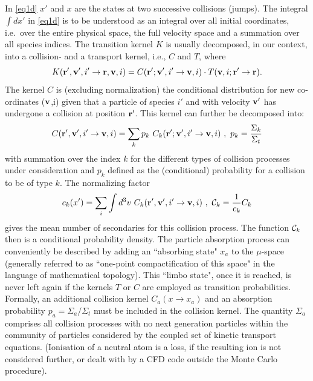 In \cref{eq1d} $x'$ and $x$ are the states at two successive collisions
(jumps).
The integral $\int dx'$ in \cref{eq1d} is to be understood as an integral over
all initial coordinates, i.e.\ over the entire physical space, the full
velocity space and a summation over all species indices.
The transition kernel $K$ is usually decomposed, in our context, into a
collision- and a transport kernel, i.e., $C$ and $T$, where
\begin{equation}
  \label{eq1.2} K(\mathbf{r}  ', \mathbf{v}  ', i ' \rightarrow \mathbf{r}, \mathbf{v}, i) = C( \mathbf{r} ' ; \mathbf{v}
  ', i '	      \rightarrow   \mathbf{v}, i)  \cdot T( \mathbf{v}, i; \mathbf{r} ' \rightarrow \mathbf{r} )
  .
\end{equation}
The kernel $C$ is (excluding normalization) the conditional distribution for
new co-ordinates ($\mathbf{v} $,i) given that a particle of species $i'$ and with
velocity $\mathbf{v}'$ has undergone a collision at position $\mathbf{r} ' $.
This kernel can further be decomposed into:
\begin{equation}
  \label{eq1.3}
  C( \mathbf{r} ', \mathbf{v} ', i '	 \rightarrow \mathbf{v}, i) = \sum_{k} {p_k  \ C_k ( \mathbf{r} ' ; \mathbf{v} ', i '   \rightarrow \mathbf{v}, i)} \ , \ p_k = \frac{\Sigma_k}{\Sigma_t}
\end{equation}
with summation over the index $k$ for the different types of
collision processes under consideration and $p_k$ defined as the (conditional)
probability for a collision to be of type $k$.
The normalizing factor
\begin{equation}
  \label{eq1.4} c_k (x ') = \sum_{i}
  \int d^3v \  C_k ( \mathbf{r} ', \mathbf{v} ', i ' \rightarrow \mathbf{v}, i ) \ , \  {\cal{C}}_k =
  \frac{1}{c_k} C_k
\end{equation}
gives the mean number of secondaries for this
collision process.
The function $ {\cal{C}}_k$ then is a conditional probability density.
The particle absorption process can conveniently be described by adding an
``absorbing state" $x_a$ to the $\mu$-space (generally referred to as
``one-point compactification of this space" in the language of mathematical
topology).
This ``limbo state", once it is reached, is never left again if the kernels $T$
or $C$ are employed as transition probabilities.
Formally, an additional collision kernel $C_a (x \rightarrow x_a )$ and an
absorption probability $ p_a = \Sigma_a / \Sigma_t$ must be included in the
collision kernel.
The quantity $ \Sigma_a$ comprises all collision processes with no next
generation particles within the community of particles considered by the
coupled set of kinetic transport equations.
(Ionisation of a neutral atom is a loss, if the resulting ion is not considered
further, or dealt with by a \ac{CFD} code outside the Monte Carlo procedure).


